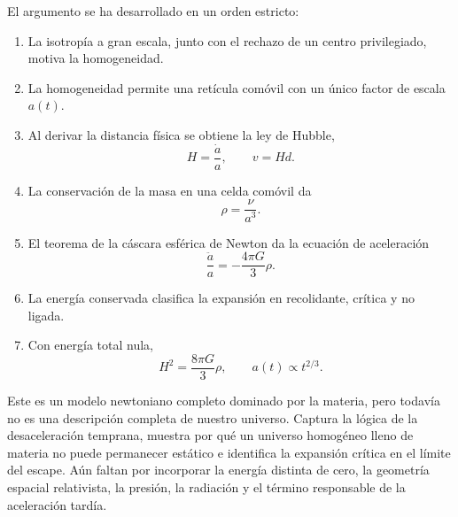 El argumento se ha desarrollado en un orden estricto:
\begin{enumerate}
\item La isotropía a gran escala, junto con el rechazo de un centro privilegiado, motiva la homogeneidad.
\item La homogeneidad permite una retícula comóvil con un único factor de escala \(a(t)\).
\item Al derivar la distancia física se obtiene la ley de Hubble,
  \[
  H=\frac{\dot a}{a},
  \qquad
  v=Hd.
  \]
\item La conservación de la masa en una celda comóvil da
  \[
  \rho=\frac{\nu}{a^3}.
  \]
\item El teorema de la cáscara esférica de Newton da la ecuación de aceleración
  \[
  \frac{\ddot a}{a}=-\frac{4\pi G}{3}\rho.
  \]
\item La energía conservada clasifica la expansión en recolidante, crítica y no ligada.
\item Con energía total nula,
  \[
  H^2=\frac{8\pi G}{3}\rho,
  \qquad
  a(t)\propto t^{2/3}.
  \]
\end{enumerate}

Este es un modelo newtoniano completo dominado por la materia, pero todavía no es una descripción completa de nuestro universo. Captura la lógica de la desaceleración temprana, muestra por qué un universo homogéneo lleno de materia no puede permanecer estático e identifica la expansión crítica en el límite del escape. Aún faltan por incorporar la energía distinta de cero, la geometría espacial relativista, la presión, la radiación y el término responsable de la aceleración tardía.